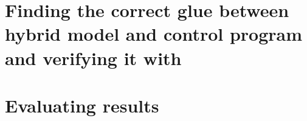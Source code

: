 \section{Finding the correct glue between hybrid model and control program and verifying it with \keym}
\label{sec:Process:Glue}

\section{Evaluating results}
\label{sec:Process:Eval}


